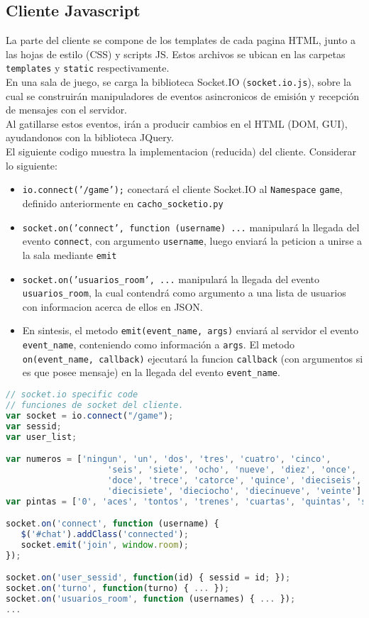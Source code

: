 \subsection{Cliente Javascript}
La parte del cliente se compone de los templates
de cada pagina HTML, junto a las hojas de estilo (CSS)
y scripts JS. Estos archivos se ubican en las carpetas
\texttt{templates} y \texttt{static} respectivamente. \\

En una sala de juego, se carga la biblioteca Socket.IO
(\texttt{socket.io.js}), sobre la cual se construirán manipuladores de eventos asincronicos de emisión y recepción de mensajes con el servidor.\\

Al gatillarse estos eventos, irán a producir cambios en el HTML (DOM, GUI),
ayudandonos con la biblioteca JQuery.\\

El siguiente codigo muestra la implementacion (reducida) del cliente. Considerar lo siguiente:
\begin{itemize}
	\item \texttt{io.connect('/game');} conectará el cliente Socket.IO al \texttt{Namespace}
	\texttt{game}, definido anteriormente en \texttt{cacho\_socketio.py}
	\item \texttt{socket.on('connect', function (username) ...} manipulará la llegada del evento
	\texttt{connect}, con argumento \texttt{username}, luego enviará la peticion a unirse a la sala
	mediante \texttt{emit}
	\item \texttt{socket.on('usuarios\_room', ...} manipulará la llegada del evento \texttt{usuarios\_room}, la cual contendrá como argumento a una lista de usuarios con informacion acerca de ellos en JSON.
	\item En sintesis, el metodo \texttt{emit(event\_name, args)} enviará al servidor el evento \texttt{event\_name},
	conteniendo como información a \texttt{args}. El metodo \texttt{on(event\_name, callback)} ejecutará
	la funcion \texttt{callback} (con argumentos si es que posee mensaje) en la llegada del evento \texttt{event\_name}.
\end{itemize}

\begin{lstlisting}[language=JavaScript, caption=cacho\_app/static/js/cacho.js]
// socket.io specific code
// funciones de socket del cliente.
var socket = io.connect("/game");
var sessid;
var user_list;

var numeros = ['ningun', 'un', 'dos', 'tres', 'cuatro', 'cinco',
					'seis', 'siete', 'ocho', 'nueve', 'diez', 'once',
					'doce', 'trece', 'catorce', 'quince', 'dieciseis',
					'diecisiete', 'dieciocho', 'diecinueve', 'veinte']
var pintas = ['0', 'aces', 'tontos', 'trenes', 'cuartas', 'quintas', 'sextas']

socket.on('connect', function (username) {
   $('#chat').addClass('connected');
   socket.emit('join', window.room);
});

socket.on('user_sessid', function(id) { sessid = id; });
socket.on('turno', function(turno) { ... });
socket.on('usuarios_room', function (usernames) { ... });
...
\end{lstlisting}




